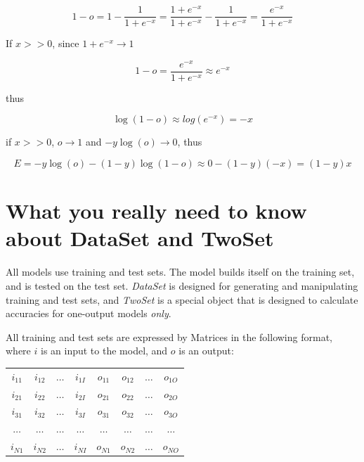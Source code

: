 \documentclass{report}
\begin{document}
\begin{displaymath}
1-o = 1-\frac{1}{1+e^{-x}} = \frac{1+e^{-x}}{1+e^{-x}}
- \frac{1}{1+e^{-x}} = \frac{e^{-x}}{1+e^{-x}}
\end{displaymath}

If $x >> 0$, since $1+e^{-x} \rightarrow 1$

\begin{displaymath}
1-o=\frac{e^{-x}}{1+e^{-x}} \approx e^{-x}
\end{displaymath}

thus

\begin{displaymath}
\log(1-o) \approx log(e^{-x}) = -x
\end{displaymath}

if $x >> 0$, $o \rightarrow 1$ and $-y\log(o) \rightarrow 0$,
thus

\begin{displaymath}
E = - y\log(o)-(1-y)\log(1-o) \approx 0 - (1-y)(-x) = (1-y)x
\end{displaymath}

\section{What you really need to know about DataSet and TwoSet}

All models use training and test sets.  The model builds itself on the
training set, and is tested on the test set.  {\em DataSet} is
designed for generating and manipulating training and test sets, and
{\em TwoSet} is a special object that is designed to calculate
accuracies for one-output models {\em only}.

All training and test sets are expressed by Matrices in the following
format, where $i$ is an input to the model, and $o$ is an output:

\begin{center}
\begin{tabular}{cccccccc}
$i_{11}$ & $i_{12}$ & $\ldots$ & $i_{1I}$ & $o_{11}$ & $o_{12}$ &
$\ldots$ & $o_{1O}$ \\
$i_{21}$ & $i_{22}$ & $\ldots$ & $i_{2I}$ & $o_{21}$ & $o_{22}$ &
$\ldots$ & $o_{2O}$ \\
$i_{31}$ & $i_{32}$ & $\ldots$ & $i_{3I}$ & $o_{31}$ & $o_{32}$ &
$\ldots$ & $o_{3O}$ \\
$\ldots$ & $\ldots$ & $\ldots$ & $\ldots$ & $\ldots$ & $\ldots$ &
$\ldots$ & $\ldots$ \\
$i_{N1}$ & $i_{N2}$ & $\ldots$ & $i_{NI}$ & $o_{N1}$ & $o_{N2}$ &
$\ldots$ & $o_{NO}$ \\
\end{tabular}
\end{center}
\end{document}
